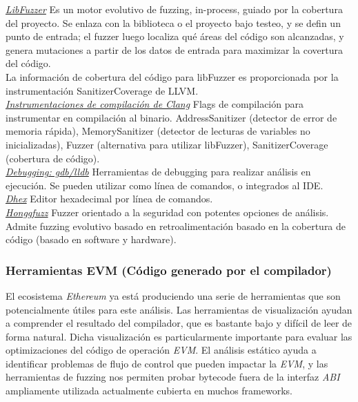 \underline{\textit{LibFuzzer}}\cite{LibFuzzerLink}
Es un motor evolutivo de fuzzing, in-process, guiado por la cobertura del proyecto. Se enlaza con la biblioteca o el proyecto bajo testeo, y se defin un punto de entrada; el fuzzer luego localiza qué áreas del código son alcanzadas, y genera mutaciones a partir de los datos de entrada para maximizar la covertura del código.\\
La información de cobertura del código para libFuzzer es proporcionada por la instrumentación SanitizerCoverage de LLVM.\\

\underline{\textit{Instrumentaciones de compilación de Clang}}\cite{ClangInstrumentationLink}
Flags de compilación para instrumentar en compilación al binario.
AddressSanitizer\cite{AddressSanitizerLink} (detector de error de memoria rápida), MemorySanitizer\cite{MemorySanitizerLink} (detector de lecturas de variables no inicializadas), Fuzzer (alternativa para utilizar libFuzzer), SanitizerCoverage\cite{SanitizerCoverageLink} (cobertura de código).\\

\underline{\textit{Debugging: gdb/lldb\cite{gdbLink}\cite{lldbLink}}}
Herramientas de debugging para realizar análisis en ejecución. Se pueden utilizar como línea de comandos, o integrados al IDE.\\

\underline{\textit{Dhex}}\cite{DhexLink}
Editor hexadecimal por línea de comandos.\\

\underline{\textit{Honggfuzz}}\cite{HonggfuzzLink}
Fuzzer orientado a la seguridad con potentes opciones de análisis. Admite fuzzing evolutivo basado en retroalimentación basado en la cobertura de código (basado en software y hardware).

\subsubsection{Herramientas EVM (Código generado por el compilador)}

El ecosistema \textit{Ethereum} ya está produciendo una serie de herramientas que son potencialmente útiles para este análisis. Las herramientas de visualización ayudan a comprender el resultado del compilador, que es bastante bajo y difícil de leer de forma natural. Dicha visualización es particularmente importante para evaluar las optimizaciones del código de operación \textit{EVM}. El análisis estático ayuda a identificar problemas de flujo de control que pueden impactar la \textit{EVM}, y las herramientas de fuzzing nos permiten probar bytecode fuera de la interfaz \textit{ABI} ampliamente utilizada actualmente cubierta en muchos frameworks.\\

